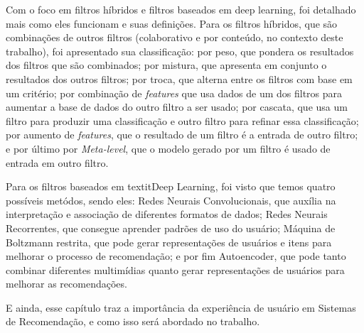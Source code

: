 Com o foco em filtros híbridos e filtros baseados em deep learning, foi detalhado mais como eles funcionam e suas definições.
Para os filtros híbridos, que são combinações de outros filtros (colaborativo e por conteúdo, no contexto deste trabalho),
foi apresentado sua classificação: por peso, que pondera os resultados dos filtros que são combinados; por mistura, que 
apresenta em conjunto o resultados dos outros filtros; por troca, que alterna entre os filtros com base em um critério;
por combinação de \textit{features} que usa dados de um dos filtros para aumentar a base de dados do outro filtro a ser usado;
por cascata, que usa um filtro para produzir uma classificação e outro filtro para refinar essa classificação; por aumento
de \textit{features}, que o resultado de um filtro é a entrada de outro filtro; e por último por \textit{Meta-level}, que
o modelo gerado por um filtro é usado de entrada em outro filtro.

Para os filtros baseados em textit{Deep Learning}, foi visto que temos quatro possíveis metódos, sendo eles: Redes Neurais 
Convolucionais, que auxília na interpretação e associação de diferentes formatos de dados; Redes Neurais Recorrentes, 
que consegue aprender padrões de uso do usuário; Máquina de Boltzmann restrita, que pode gerar representações de usuários
e itens para melhorar o processo de recomendação; e por fim Autoencoder, que pode tanto combinar diferentes multimídias quanto 
gerar representações de usuários para melhorar as recomendações.

E ainda, esse capítulo traz a importância da experiência de usuário em Sistemas de Recomendação, e como isso será abordado
no trabalho.